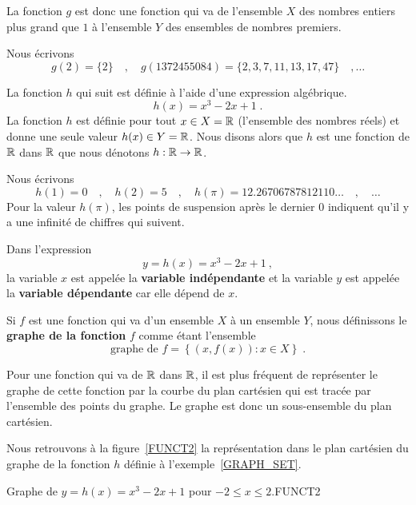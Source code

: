 {\begin{egg}
La fonction $g$ est donc une fonction qui va de l'ensemble $X$ des
nombres entiers plus grand que $1$ à l'ensemble $Y$ des ensembles de
nombres premiers.

Nous écrivons
\[
g(2) = \{2\} \quad , \quad g(1372455084) = \{2,3,7,11,13,17,47\}
\quad , \ldots
\]
\label{TABLE}
\end{egg}

\begin{egg}
La fonction $h$ qui suit est définie à l'aide d'une expression
algébrique.
\[
h(x) = x^3-2x+1 \; .
\]
La fonction $h$ est définie pour tout $x \in X = \mathbb{R}$ (l'ensemble des
nombres réels) et donne une seule valeur $h(x) \in Y = \mathbb{R}$.  Nous
disons alors que $h$ est une fonction de $\mathbb{R}$ dans $\mathbb{R}$ que nous
dénotons $h:\mathbb{R} \rightarrow \mathbb{R}$. 

Nous écrivons
\[
h(1) = 0 \quad , \quad h(2) = 5 \quad , \quad h(\pi)=
12.26706787812110\ldots \quad , \quad \ldots
\]
Pour la valeur $h(\pi)$, les points de suspension après le
dernier $0$ indiquent qu'il y a une infinité de chiffres qui
suivent.

Dans l'expression
\[
y=h(x)=x^3 -2x +1 \ ,
\]
la variable $x$ est appelée la {\bfseries variable indépendante}
 et la variable $y$ est appelée
la {\bfseries variable dépendante} 
car elle dépend de $x$.
\label{GRAPH_SET}
\end{egg}

\begin{defn} 
Si $f$ est une fonction qui va d'un ensemble $X$ à un ensemble $Y$,
nous définissons le {\bfseries graphe de la fonction}
$f$ comme étant l'ensemble
\[
\text{graphe de }f = \left\{ (x,f(x)) : x \in X \right\} \; .
\]
\end{defn}

Pour une fonction qui va de $\mathbb{R}$ dans $\mathbb{R}$, il est plus fréquent de
représenter le graphe de cette fonction par la courbe du plan
cartésien qui est tracée par l'ensemble des points du graphe.  Le
graphe est donc un sous-ensemble du plan cartésien.

\begin{egg}
Nous retrouvons à la figure~\ref{FUNCT2} la représentation dans le plan
cartésien du graphe de la fonction $h$ définie à
l'exemple~\ref{GRAPH_SET}.
\end{egg}

{Graphe de $y= h(x) = x^3-2x+1$ pour $-2 \leq x \leq 2$.}{FUNCT2}

}
